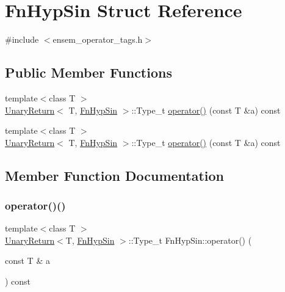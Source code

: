 \hypertarget{structFnHypSin}{}\section{Fn\+Hyp\+Sin Struct Reference}
\label{structFnHypSin}


{\ttfamily \#include $<$ensem\+\_\+operator\+\_\+tags.\+h$>$}

\subsection*{Public Member Functions}
\begin{DoxyCompactItemize}
\item 
{\footnotesize template$<$class T $>$ }\\\mbox{\hyperlink{structUnaryReturn}{Unary\+Return}}$<$ T, \mbox{\hyperlink{structFnHypSin}{Fn\+Hyp\+Sin}} $>$\+::Type\+\_\+t \mbox{\hyperlink{structFnHypSin_adea3b5d45ae2d7b5ab84b310d4d4e339}{operator()}} (const T \&a) const
\item 
{\footnotesize template$<$class T $>$ }\\\mbox{\hyperlink{structUnaryReturn}{Unary\+Return}}$<$ T, \mbox{\hyperlink{structFnHypSin}{Fn\+Hyp\+Sin}} $>$\+::Type\+\_\+t \mbox{\hyperlink{structFnHypSin_adea3b5d45ae2d7b5ab84b310d4d4e339}{operator()}} (const T \&a) const
\end{DoxyCompactItemize}


\subsection{Member Function Documentation}
\mbox{\label{structFnHypSin_adea3b5d45ae2d7b5ab84b310d4d4e339}} 
\subsubsection{\texorpdfstring{operator()()}{operator()()}\hspace{0.1cm}{\footnotesize\ttfamily [1/2]}}
{\footnotesize\ttfamily template$<$class T $>$ \\
\mbox{\hyperlink{structUnaryReturn}{Unary\+Return}}$<$T, \mbox{\hyperlink{structFnHypSin}{Fn\+Hyp\+Sin}} $>$\+::Type\+\_\+t Fn\+Hyp\+Sin\+::operator() (\begin{DoxyParamCaption}\item[{const T \&}]{a }\end{DoxyParamCaption}) const\hspace{0.3cm}{\ttfamily [inline]}}

